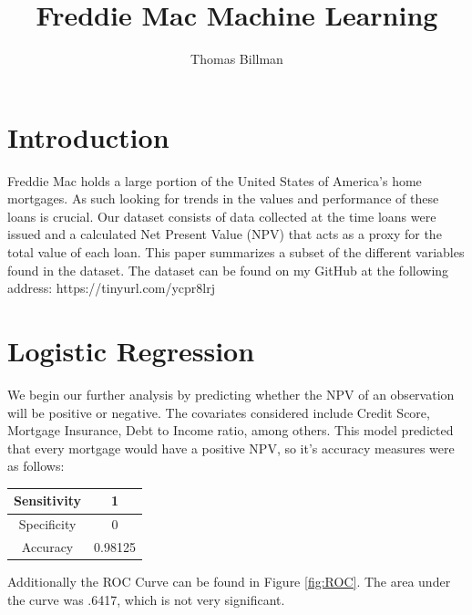 \documentclass[10pt,twocolumn,letterpaper]{article}
\begin{document}
\title{Freddie Mac Machine Learning}

\author{Thomas Billman}

\maketitle


\section{Introduction}

Freddie Mac holds a large portion of the United States of America's home mortgages. As such looking for trends in the values and performance of these loans is crucial. Our dataset consists of data collected at the time loans were issued and a calculated Net Present Value (NPV) that acts as a proxy for the total value of each loan. This paper summarizes a subset of the different variables found in the dataset. The dataset can be found on my GitHub at the following address:
https://tinyurl.com/ycpr8lrj

\section{Logistic Regression}
We begin our further analysis by predicting whether the NPV of an observation will be positive or negative. The covariates considered include Credit Score, Mortgage Insurance, Debt to Income ratio, among others. This model predicted that every mortgage would have a positive NPV, so it's accuracy measures were as follows:
\begin{center}
\begin{tabular}{ |c|c| } 
	\hline
	Sensitivity & 1 \\ 
	\hline
	Specificity & 0 \\
	\hline
	Accuracy & 0.98125\\ 
	\hline
\end{tabular}
\end{center}

Additionally the ROC Curve can be found in Figure \ref{fig:ROC}. The area under the curve was .6417, which is not very significant.
\end{document}

